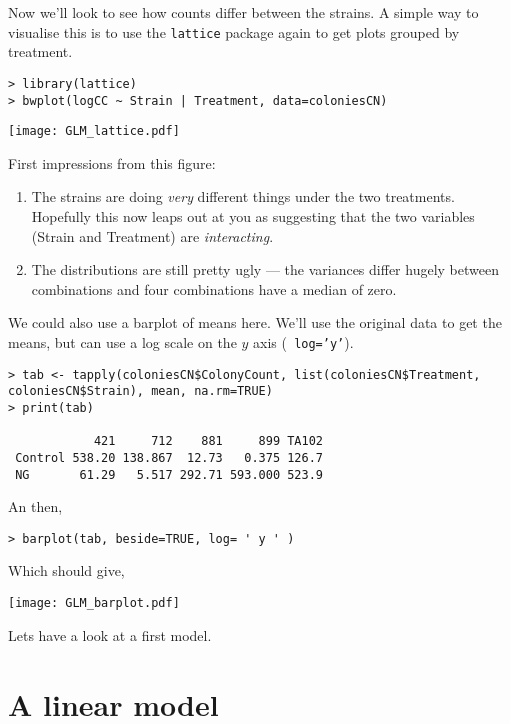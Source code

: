 Now we'll look to see how counts differ between the strains.  A simple 
way to visualise this is to use the {\tt lattice} package again to get 
plots grouped by treatment.

\begin{lstlisting}
> library(lattice) 
> bwplot(logCC ~ Strain | Treatment, data=coloniesCN)
\end{lstlisting}

\begin{center}
	\texttt{[image: GLM\_lattice.pdf]}	
\end{center}

First impressions from this figure:
\begin{enumerate}
	\item The strains are doing {\it very} different things under the two 
	treatments. Hopefully this now leaps out at you as suggesting that 
	the two variables (Strain and Treatment) are {\it interacting}. \item 
	The distributions are still pretty ugly --- the variances differ 
	hugely between combinations and four combinations have a median of 
	zero.
\end{enumerate}

We could also use a barplot of means here. We'll use the original data 
to get the means, but can use a log scale on the $y$ axis ({\tt 
log='y'}).

\begin{lstlisting}
> tab <- tapply(coloniesCN$ColonyCount, list(coloniesCN$Treatment,
coloniesCN$Strain), mean, na.rm=TRUE)
> print(tab)

            421     712    881     899 TA102
 Control 538.20 138.867  12.73   0.375 126.7
 NG       61.29   5.517 292.71 593.000 523.9
\end{lstlisting}

An then, 

\begin{lstlisting}
> barplot(tab, beside=TRUE, log= ' y ' )	
\end{lstlisting}

Which should give,
\begin{center}
	\texttt{[image: GLM\_barplot.pdf]} 
\end{center}

Lets have a look at a first model.

\section{A linear model}

